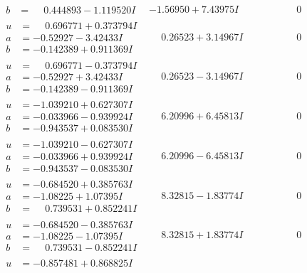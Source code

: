 \documentclass[1p]{elsarticle_modified}
\theoremstyle{definition}
\begin{document}
$$\begin{array}{c|c|c}
\begin{aligned}
b &= \phantom{-}0.444893 - 1.119520 I\end{aligned}
 & -1.56950 + 7.43975 I & \phantom{-0.000000 } 0 \\ \hline\begin{aligned}
u &= \phantom{-}0.696771 + 0.373794 I \\
a &= -0.52927 - 3.42433 I \\
b &= -0.142389 + 0.911369 I\end{aligned}
 & \phantom{-}0.26523 + 3.14967 I & \phantom{-0.000000 } 0 \\ \hline\begin{aligned}
u &= \phantom{-}0.696771 - 0.373794 I \\
a &= -0.52927 + 3.42433 I \\
b &= -0.142389 - 0.911369 I\end{aligned}
 & \phantom{-}0.26523 - 3.14967 I & \phantom{-0.000000 } 0 \\ \hline\begin{aligned}
u &= -1.039210 + 0.627307 I \\
a &= -0.033966 - 0.939924 I \\
b &= -0.943537 + 0.083530 I\end{aligned}
 & \phantom{-}6.20996 + 6.45813 I & \phantom{-0.000000 } 0 \\ \hline\begin{aligned}
u &= -1.039210 - 0.627307 I \\
a &= -0.033966 + 0.939924 I \\
b &= -0.943537 - 0.083530 I\end{aligned}
 & \phantom{-}6.20996 - 6.45813 I & \phantom{-0.000000 } 0 \\ \hline\begin{aligned}
u &= -0.684520 + 0.385763 I \\
a &= -1.08225 + 1.07395 I \\
b &= \phantom{-}0.739531 + 0.852241 I\end{aligned}
 & \phantom{-}8.32815 - 1.83774 I & \phantom{-0.000000 } 0 \\ \hline\begin{aligned}
u &= -0.684520 - 0.385763 I \\
a &= -1.08225 - 1.07395 I \\
b &= \phantom{-}0.739531 - 0.852241 I\end{aligned}
 & \phantom{-}8.32815 + 1.83774 I & \phantom{-0.000000 } 0 \\ \hline\begin{aligned}
u &= -0.857481 + 0.868825 I \\

\end{aligned}
\end{array}$$
\end{document}
